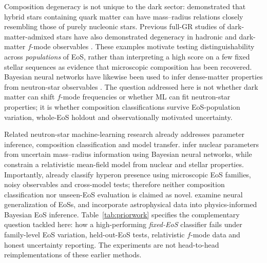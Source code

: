 \documentclass[11pt,a4paper]{article}
\begin{document}
Composition degeneracy is not unique to the dark sector: \citet{Alford05} demonstrated that hybrid stars containing quark matter can have mass--radius relations closely resembling those of purely nucleonic stars. Previous full-GR studies of dark-matter-admixed stars have also demonstrated degeneracy in hadronic and dark-matter $f$-mode observables \citep{Shirke24}. These examples motivate testing distinguishability across \emph{populations} of EoS, rather than interpreting a high score on a few fixed stellar sequences as evidence that microscopic composition has been recovered. Bayesian neural networks have likewise been used to infer dense-matter properties from neutron-star observables \citep{Carvalho23}. The question addressed here is not whether dark matter can shift $f$-mode frequencies or whether ML can fit neutron-star properties; it is whether composition classifications survive EoS-population variation, whole-EoS holdout and observationally motivated uncertainty.



Related neutron-star machine-learning research already addresses parameter inference, composition classification and model transfer. \citet{Carvalho24MR} infer nuclear parameters from uncertain mass--radius information using Bayesian neural networks, while \citet{Guo24} constrain a relativistic mean-field model from nuclear and stellar properties. Importantly, \citet{Carvalho24Hyp} already classify hyperon presence using microscopic EoS families, noisy observables and cross-model tests; therefore neither composition classification nor unseen-EoS evaluation is claimed as novel. \citet{Goncalves25} examine neural generalization of EoSs, and \citet{Baker26} incorporate astrophysical data into physics-informed Bayesian EoS inference. Table~\ref{tab:priorwork} specifies the complementary question tackled here: how a high-performing \emph{fixed-EoS} classifier fails under family-level EoS variation, held-out-EoS tests, relativistic $f$-mode data and honest uncertainty reporting. The experiments are not head-to-head reimplementations of these earlier methods.
\end{document}
